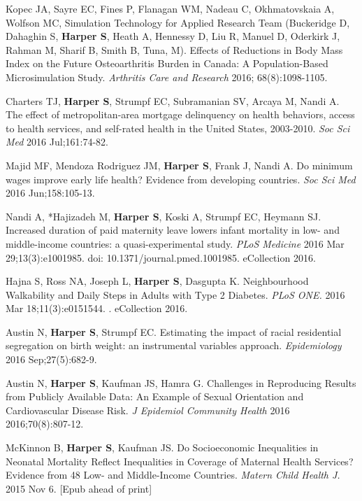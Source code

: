 \documentclass[
  letterpaper,
  DIV=11,
  numbers=noendperiod]{scrartcl}
\begin{document}
\begin{etaremune}
\item Kopec JA, Sayre EC, Fines P, Flanagan WM, Nadeau C, Okhmatovskaia A, Wolfson MC, Simulation Technology for Applied Research Team (Buckeridge D, Dahaghin S, \textbf{Harper S}, Heath A, Hennessy D,  Liu R, Manuel D, Oderkirk J, Rahman M,  Sharif B, Smith B, Tuna, M). Effects of Reductions in Body Mass Index on the Future Osteoarthritis Burden in Canada: A Population-Based Microsimulation Study. \emph{Arthritis Care and Research} 2016; 68(8):1098-1105.
 
\item Charters TJ, \textbf{Harper S}, Strumpf EC, Subramanian SV, Arcaya M, Nandi A. The effect of metropolitan-area mortgage delinquency on health behaviors, access to health services, and self-rated health in the United States, 2003-2010. \emph{Soc Sci Med} 2016 Jul;161:74-82.
 
\item *Majid MF, Mendoza Rodriguez JM, \textbf{Harper S}, Frank J, Nandi A. Do minimum wages improve early life health? Evidence from developing countries. \emph{Soc Sci Med} 2016 Jun;158:105-13.
 
\item Nandi A, *Hajizadeh M, \textbf{Harper S}, Koski A, Strumpf EC, Heymann SJ. Increased duration of paid maternity leave lowers infant mortality in low- and middle-income countries: a quasi-experimental study. \emph{PLoS Medicine} 2016 Mar 29;13(3):e1001985. doi: 10.1371/journal.pmed.1001985. eCollection 2016.
 
\item Hajna S, Ross NA, Joseph L, \textbf{Harper S}, Dasgupta K. Neighbourhood Walkability and Daily Steps in Adults with Type 2 Diabetes. \emph{PLoS ONE.} 2016 Mar 18;11(3):e0151544. . eCollection 2016.
 
\item *Austin N, \textbf{Harper S}, Strumpf EC. Estimating the impact of racial residential segregation on birth weight: an instrumental variables approach. \emph{Epidemiology} 2016 Sep;27(5):682-9.
 
\item *Austin N, \textbf{Harper S}, Kaufman JS, Hamra G. Challenges in Reproducing Results from Publicly Available Data: An Example of Sexual Orientation and Cardiovascular Disease Risk. \emph{J Epidemiol Community Health} 2016 2016;70(8):807-12.
 
\item *McKinnon B, \textbf{Harper S}, Kaufman JS. Do Socioeconomic Inequalities in Neonatal Mortality Reflect Inequalities in Coverage of Maternal Health Services? Evidence from 48 Low- and Middle-Income Countries. \emph{Matern Child Health J.} 2015 Nov 6. [Epub ahead of print]


\end{etaremune}
\end{document}
